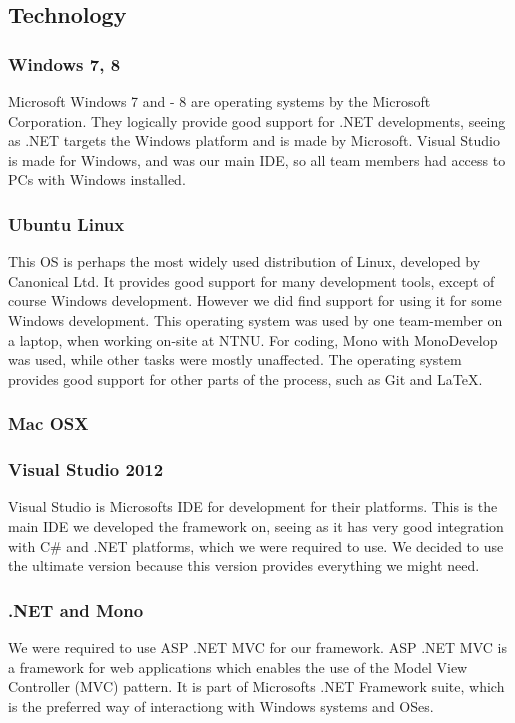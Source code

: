 \subsection{Technology}

\subsubsection{Windows 7, 8}
Microsoft Windows 7 and - 8 are operating systems by the Microsoft Corporation. They logically provide good support for .NET developments, seeing as .NET targets the Windows platform and is made by Microsoft. Visual Studio is made for Windows, and was our main IDE, so all team members had access to PCs with Windows installed.

\subsubsection{Ubuntu Linux}
This OS is perhaps the most widely used distribution of Linux, developed by Canonical Ltd. It provides good support for many development tools, except of course Windows development. However we did find support for using it for some Windows development.
This operating system was used by one team-member on a laptop, when working on-site at NTNU. For coding, Mono with MonoDevelop was used, while other tasks were mostly unaffected. The operating system provides good support for other parts of the process, such as Git and \LaTeX.

\subsubsection{Mac OSX}

\subsubsection{Visual Studio 2012}
Visual Studio is Microsofts IDE for development for their platforms. This is the main IDE we developed the framework on, seeing as it has very good integration with C\# and .NET platforms, which we were required to use. We decided to use the ultimate version because this version provides everything we might need.

\subsubsection{.NET and Mono}
We were required to use ASP .NET MVC for our framework. ASP .NET MVC is a framework for web applications which enables the use of the Model View Controller (MVC) pattern. It is part of Microsofts .NET Framework suite, which is the preferred way of interactiong with Windows systems and OSes.

